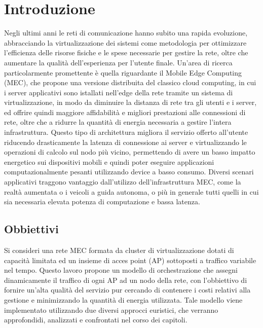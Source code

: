 \chapter{Introduzione}
\label{cap:introduzione}

Negli ultimi anni le reti di comunicazione hanno subito una rapida evoluzione, abbracciando la virtualizzazione dei sistemi come metodologia per ottimizzare l'efficienza delle risorse fisiche e le spese necessarie per gestire la rete, oltre che aumentare la qualità dell'esperienza per l'utente finale. Un'area di ricerca particolarmente promettente è quella riguardante il Mobile Edge Computing (MEC), che propone una versione distribuita del classico cloud computing, in cui i server applicativi sono istallati nell'edge della rete tramite un sistema di virtualizzazione, in modo da diminuire la distanza di rete tra gli utenti e i server, ed offrire quindi maggiore affidabilità e migliori prestazioni alle connessioni di rete, oltre che a ridurre la quantità di energia necessaria a gestire l'intera infrastruttura. Questo tipo di architettura migliora il servizio offerto all'utente riducendo drasticamente la latenza di connessione ai server e virtualizzando le operazioni di calcolo sul nodo più vicino, permettendo di avere un basso impatto energetico sui dispositivi mobili e quindi poter eseguire applicazioni computazionalmente pesanti utilizzando device a basso consumo. Diversi scenari applicativi traggono vantaggio dall'utilizzo dell'infrastruttura MEC, come la realtà aumentata o i veicoli a guida autonoma, o più in generale tutti quelli in cui sia necessaria elevata potenza di computazione e bassa latenza.


%
%
\section{Obbiettivi}
\label{sec:obbiettivi}

Si consideri una rete MEC formata da cluster di virtualizzazione dotati di capacità limitata ed un insieme di acces point (AP) sottoposti a traffico variabile nel tempo. Questo lavoro propone un modello di orchestrazione che assegni dinamicamente il traffico di ogni AP ad un nodo della rete, con l'obbiettivo di fornire un'alta qualità del servizio pur cercando di contenere i costi relativi alla gestione e minimizzando la quantità di energia utilizzata. Tale modello viene implementato utilizzando due diversi approcci euristici, che verranno approfondidi, analizzati e confrontati nel corso dei capitoli.


